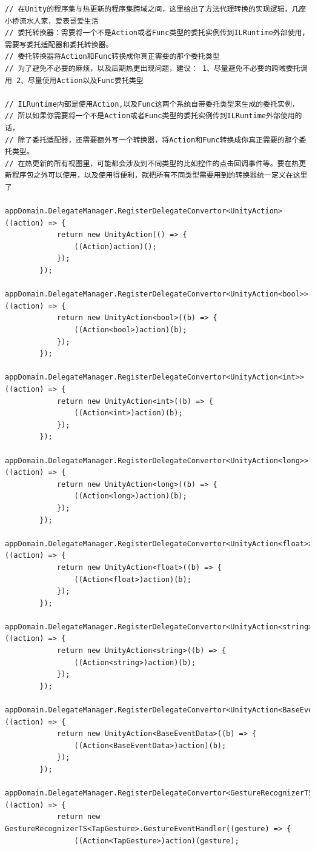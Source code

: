 \documentclass[9pt, b5paper]{article}
\begin{document}
\begin{verbatim}
// 在Unity的程序集与热更新的程序集跨域之间，这里给出了方法代理转换的实现逻辑，几座小桥流水人家，爱表哥爱生活
// 委托转换器：需要将一个不是Action或者Func类型的委托实例传到ILRuntime外部使用，需要写委托适配器和委托转换器。
// 委托转换器将Action和Func转换成你真正需要的那个委托类型
// 为了避免不必要的麻烦，以及后期热更出现问题，建议： 1、尽量避免不必要的跨域委托调用 2、尽量使用Action以及Func委托类型

// ILRuntime内部是使用Action,以及Func这两个系统自带委托类型来生成的委托实例，
// 所以如果你需要将一个不是Action或者Func类型的委托实例传到ILRuntime外部使用的话，
// 除了委托适配器，还需要额外写一个转换器，将Action和Func转换成你真正需要的那个委托类型。
// 在热更新的所有视图里，可能都会涉及到不同类型的比如控件的点击回调事件等。要在热更新程序包之外可以使用，以及使用得便利，就把所有不同类型需要用到的转换器统一定义在这里了
        appDomain.DelegateManager.RegisterDelegateConvertor<UnityAction>((action) => {
            return new UnityAction(() => {
                ((Action)action)();
            });
        });
        appDomain.DelegateManager.RegisterDelegateConvertor<UnityAction<bool>>((action) => {
            return new UnityAction<bool>((b) => {
                ((Action<bool>)action)(b);
            });
        });
        appDomain.DelegateManager.RegisterDelegateConvertor<UnityAction<int>>((action) => {
            return new UnityAction<int>((b) => {
                ((Action<int>)action)(b);
            });
        });
        appDomain.DelegateManager.RegisterDelegateConvertor<UnityAction<long>>((action) => {
            return new UnityAction<long>((b) => {
                ((Action<long>)action)(b);
            });
        });
        appDomain.DelegateManager.RegisterDelegateConvertor<UnityAction<float>>((action) => {
            return new UnityAction<float>((b) => {
                ((Action<float>)action)(b);
            });
        });
        appDomain.DelegateManager.RegisterDelegateConvertor<UnityAction<string>>((action) => {
            return new UnityAction<string>((b) => {
                ((Action<string>)action)(b);
            });
        });
        appDomain.DelegateManager.RegisterDelegateConvertor<UnityAction<BaseEventData>>((action) => {
            return new UnityAction<BaseEventData>((b) => {
                ((Action<BaseEventData>)action)(b);
            });
        });
        appDomain.DelegateManager.RegisterDelegateConvertor<GestureRecognizerTS<TapGesture>.GestureEventHandler>((action) => {
            return new GestureRecognizerTS<TapGesture>.GestureEventHandler((gesture) => {
                ((Action<TapGesture>)action)(gesture);

\end{verbatim}
\end{document}
